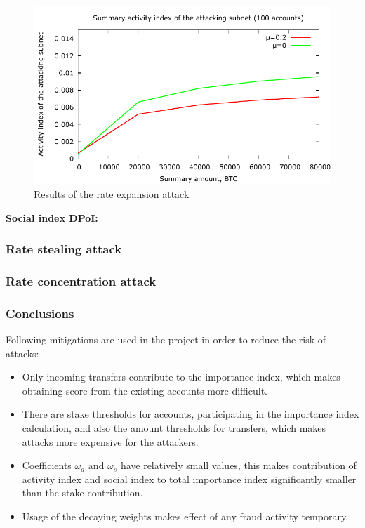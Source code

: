 \documentclass[a4paper,12pt]{article}
\begin{document}
\begin{figure}[H]
      \includegraphics[width=1\linewidth]{pictures/chain-attack-index-amount-relation.pdf}
      \caption{Results of the rate expansion attack}
      \label{fig:chain-attack-index-amount-relation}
\end{figure}

\textbf{Social index DPoI:} 
\subsubsection{Rate stealing attack}

\subsubsection{Rate concentration attack}

\subsubsection{Conclusions}
Following mitigations are used in the project in order to reduce the risk of attacks:

\begin{itemize}
  \item Only incoming transfers contribute to the importance index, which makes obtaining score from the existing accounts more difficult.
  \item There are stake thresholds for accounts, participating in the importance index calculation, and also the amount thresholds for transfers, which makes attacks more expensive for the attackers.
  \item Coefficients $\omega_a$ and $\omega_s$ have relatively small values, this makes contribution of activity index and social index to total importance index significantly smaller than the stake contribution.
  \item Usage of the decaying weights makes effect of any fraud activity temporary. 
\end{itemize}
\end{document}
